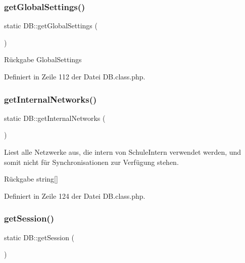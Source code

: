 \subsubsection{\texorpdfstring{get\+Global\+Settings()}{getGlobalSettings()}}
{\footnotesize\ttfamily static D\+B\+::get\+Global\+Settings (\begin{DoxyParamCaption}{ }\end{DoxyParamCaption})\hspace{0.3cm}{\ttfamily [static]}}

\begin{DoxyReturn}{Rückgabe}
Global\+Settings 
\end{DoxyReturn}


Definiert in Zeile 112 der Datei D\+B.\+class.\+php.

\mbox{\label{class_d_b_a422aa16764ad5b26d960fd9ba5978458}} 
\subsubsection{\texorpdfstring{get\+Internal\+Networks()}{getInternalNetworks()}}
{\footnotesize\ttfamily static D\+B\+::get\+Internal\+Networks (\begin{DoxyParamCaption}{ }\end{DoxyParamCaption})\hspace{0.3cm}{\ttfamily [static]}}

Liest alle Netzwerke aus, die intern von Schule\+Intern verwendet werden, und somit nicht für Synchronisationen zur Verfügung stehen. \begin{DoxyReturn}{Rückgabe}
string\mbox{[}\mbox{]} 
\end{DoxyReturn}


Definiert in Zeile 124 der Datei D\+B.\+class.\+php.

\mbox{\label{class_d_b_a59bd612b741f468f0e14531e05a33892}} 
\subsubsection{\texorpdfstring{get\+Session()}{getSession()}}
{\footnotesize\ttfamily static D\+B\+::get\+Session (\begin{DoxyParamCaption}{ }\end{DoxyParamCaption})\hspace{0.3cm}{\ttfamily [static]}}

